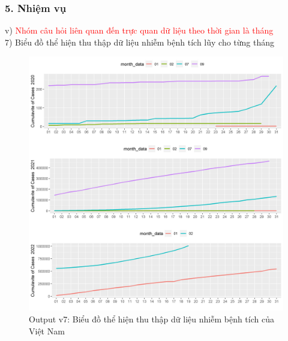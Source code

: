 \documentclass[english,10pt,table]{beamer}
\begin{document}
\begin{frame}[fragile]
\frametitle{5.  Nhiệm vụ}
v) \textcolor{red}{Nhóm câu hỏi liên quan đến trực quan dữ liệu theo thời gian là tháng}\\
    7) Biểu đồ thể hiện thu thập dữ liệu nhiễm bệnh tích lũy cho từng tháng
	\begin{figure}[h!]
	\begin{center}
		    \includegraphics[scale = 0.26]{Images/V/v7 Vietnam .jpeg}
		     \caption{Output v7: Biểu đồ thể hiện thu thập dữ liệu nhiễm bệnh tích của Việt Nam}
		\end{center}
		\end{figure}
\end{frame}
\end{document}
